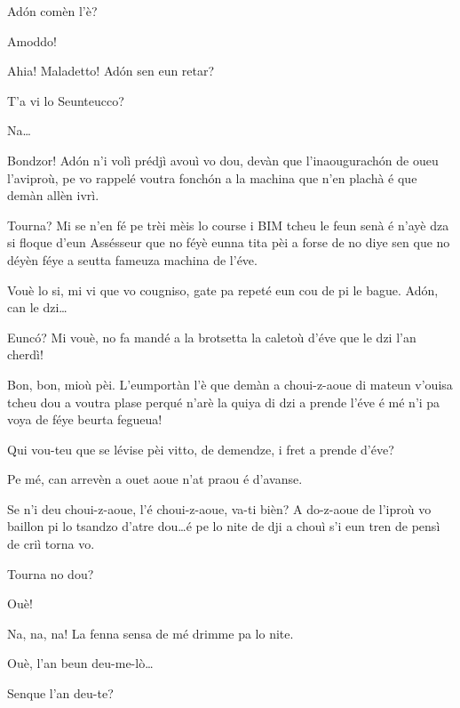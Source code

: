 \begin{drama}
\Diegospeaks{} Ad\'on comèn l'è?

\Attilaspeaks {} Amoddo!

\Diegospeaks{} Ahia! Maladetto! Ad\'on sen eun retar?

\Seunteuccospeaks T'a vi lo Seunteucco?

\Attilaspeaks Na\ldots


\Seunteuccospeaks Bondzor! Ad\'on n’i volì prédjì avouì vo dou, devàn que l’inaougurach\'on de oueu l’aviproù, pe vo rappelé voutra fonch\'on a la machina que n'en plachà é que demàn allèn ivrì.

\Diegospeaks Tourna? Mi se n'en fé pe trèi mèis lo course i BIM tcheu le feun senà é n'ayè dza si floque d'eun Assésseur que no féyè eunna tita pèi a forse de no diye sen que no déyèn féye a seutta fameuza machina de l'éve.

\Seunteuccospeaks Vouè lo si, mi vi que vo cougniso, gate pa repeté eun cou de pi le bague. Ad\'on, can le dzi\ldots

\Attilaspeaks{} Eunc\'o? Mi vouè, no fa mandé a la brotsetta la caletoù d’éve que le dzi l’an cherdì!

\Seunteuccospeaks Bon, bon, mioù pèi. L’eumportàn l’è que demàn a choui-z-aoue di mateun v'ouisa tcheu dou a voutra plase perqué n’arè la quiya di dzi a prende l’éve é mé n’i pa voya de féye beurta fegueua!

\Diegospeaks Qui vou-teu que se lévise pèi vitto, de demendze, i fret a prende d’éve?

\Attilaspeaks Pe mé, can arrevèn a ouet aoue n’at praou é d'avanse.

\Seunteuccospeaks Se n’i deu choui-z-aoue, l’é choui-z-aoue, va-ti bièn? A do-z-aoue de l’iproù vo baillon pi lo tsandzo d'atre dou\ldots é pe lo nite de dji a chouì s'i eun tren de pensì de criì torna vo.

\Diegospeaks Tourna no dou?

\Seunteuccospeaks Ouè!

\Attilaspeaks Na, na, na! La fenna sensa de mé drimme pa lo nite.

\Diegospeaks {} Ouè, l’an beun deu-me-lò\ldots \malisieu

\Diegospeaks {} Senque l'an deu-te?


\end{drama}
